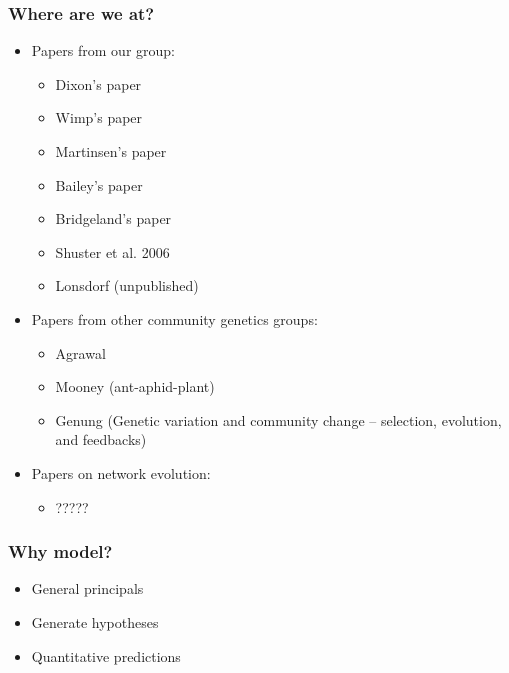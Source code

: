 \documentclass[serif,mathserif]{beamer}
\begin{document}
\begin{frame}
  \frametitle{Where are we at?}
  \begin{itemize}
  \item Papers from our group:  \pause
    \begin{itemize}
    \item Dixon's paper
    \item Wimp's paper
    \item Martinsen's paper
    \item Bailey's paper
    \item Bridgeland's paper
    \item Shuster et al. 2006
    \item Lonsdorf (unpublished)
    \end{itemize}
  \item Papers from other community genetics groups: \pause
    \begin{itemize}
    \item Agrawal
    \item Mooney (ant-aphid-plant)
    \item Genung (Genetic variation and community change – selection,
      evolution, and feedbacks)
    \end{itemize}
  \item Papers on network evolution:
    \begin{itemize}
    \item ?????
    \end{itemize}
  \end{itemize}
\end{frame}

\begin{frame}
  \frametitle{Why model?}
  \begin{itemize}
  \item General principals  \pause
  \item Generate hypotheses  \pause
  \item Quantitative predictions 
  \end{itemize}
\end{frame}


\end{document}
